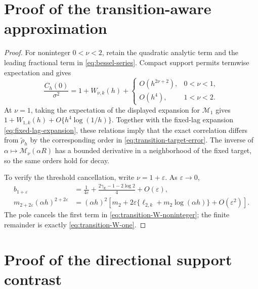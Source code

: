 \documentclass[11pt]{article}
\theoremstyle{remark}
\newcommand{\Matern}{\mathcal M}
\begin{document}
\section{Proof of the transition-aware approximation}

\begin{proof}
For noninteger \(0<\nu<2\), retain the quadratic analytic term and the
leading fractional term in \eqref{eq:bessel-series}.  Compact support permits
termwise expectation and gives
\begin{equation}
  \frac{C_h(0)}{\sigma^2}=1+W_{\nu,k}(h)+
  \begin{cases}
    O(h^{2\nu+2}), & 0<\nu<1,\\
    O(h^4), & 1<\nu<2.
  \end{cases}
  \label{eq:transition-variance-proof}
\end{equation}
At \(\nu=1\), taking the expectation of the displayed expansion for
\(\Matern_1\) gives \(1+W_{1,k}(h)+O\{h^4\log(1/h)\}\).
Together with the fixed-lag expansion \eqref{eq:fixed-lag-expansion}, these
relations imply that the exact correlation differs from
\(\widetilde\rho_h\) by the corresponding order in
\eqref{eq:transition-target-error}.  The inverse of
\(\alpha\mapsto\Matern_\nu(\alpha R)\) has a bounded derivative in a
neighborhood of the fixed target, so the same orders hold for decay.

To verify the threshold cancellation, write \(\nu=1+\varepsilon\).  As
\(\varepsilon\to0\),
\begin{align}
  b_{1+\varepsilon}
  &=\frac1{4\varepsilon}
    +\frac{2\gamma_{\mathrm E}-1-2\log2}{4}+O(\varepsilon),\\
  m_{2+2\varepsilon}(\alpha h)^{2+2\varepsilon}
  &=(\alpha h)^2\left[m_2+2\varepsilon
  \{\ell_{2,k}+m_2\log(\alpha h)\}+O(\varepsilon^2)\right].
\end{align}
The pole cancels the first term in
\eqref{eq:transition-W-noninteger}; the finite remainder is exactly
\eqref{eq:transition-W-one}.
\end{proof}

\section{Proof of the directional support contrast}
\end{document}
